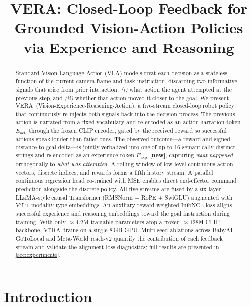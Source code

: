\documentclass{article}
\title{\textbf{VERA}: Closed-Loop Feedback for\\
       Grounded Vision-Action Policies via Experience and Reasoning}
\author{}
\newcommand{\modelname}{\textsc{VERA}\xspace}
\newcommand{\Lact}{$E_{\mathrm{act}}$\xspace}   %
\newcommand{\Lexp}{$E_{\mathrm{exp}}$\xspace}   %
\newcommand{\NEW}{\textcolor{NewOrange}{\textbf{[new]}}\xspace}
\begin{document}
\maketitle

\begin{abstract}
Standard Vision-Language-Action (VLA) models treat each decision as a
stateless function of the current camera frame and task instruction,
discarding two informative signals that arise from prior interaction:
\emph{(i)} what action the agent attempted at the previous step, and
\emph{(ii)} whether that action moved it closer to the goal.
We present \modelname\ (Vision-Experience-Reasoning-Action), a
five-stream closed-loop robot policy that continuously re-injects both
signals back into the decision process.
The previous action is narrated from a fixed vocabulary and
re-encoded as an action narration token \Lact\ through the frozen CLIP
encoder, gated by the received reward so successful actions speak
louder than failed ones.
The observed outcome---a reward and signed distance-to-goal delta---is
jointly verbalized into one of up to 16 semantically distinct strings
and re-encoded as an experience token \Lexp\ \NEW, capturing
\emph{what happened} orthogonally to \emph{what was attempted}.
A rolling window of low-level continuous action vectors, discrete
indices, and rewards forms a fifth history stream.
A parallel continuous regression head co-trained with MSE enables
direct end-effector command prediction alongside the discrete policy.
All five streams are fused by a six-layer LLaMA-style causal
Transformer (RMSNorm + RoPE + SwiGLU) augmented with ViLT
modality-type embeddings.
An auxiliary reward-weighted InfoNCE loss aligns successful experience
and reasoning embeddings toward the goal instruction during training.
With only $\approx\!4.2$M trainable parameters atop a frozen
$\approx\!128$M CLIP backbone, \modelname\ trains on a single 8\,GB
GPU.
Multi-seed ablations across BabyAI-GoToLocal and Meta-World reach-v2
quantify the contribution of each feedback stream and validate the
alignment loss diagnostics; full results are presented in
\cref{sec:experiments}.
\end{abstract}

\section{Introduction}
\label{sec:intro}
\end{document}
